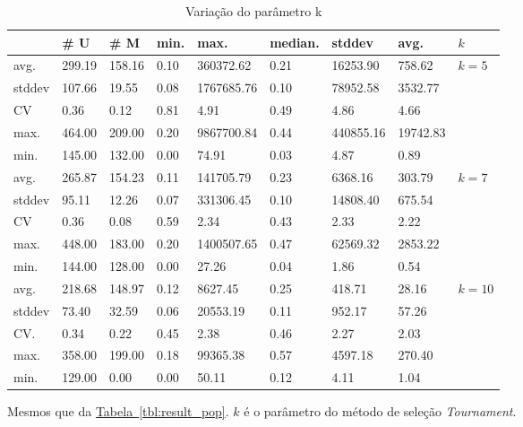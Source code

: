 \documentclass[a4paper]{article}
\begin{document}
\begin{table}
  \centering
  \caption{Variação do parâmetro k}
  \label{tbl:var_k}
  \begin{tabularx}{1\textwidth}{| X | X | X | X | X | X | X | X | X |}
    \hline
    &  \# U & \# M & min. & max. & median. & stddev & avg. & $k$ \\ \hline \hline
avg. & 299.19 & 158.16 & 0.10 & 360372.62 & 0.21 & 16253.90 & 758.62 & \multirow{5}{1.5cm}{$k=5$} \\ \cline{1-8}
stddev & 107.66 & 19.55 & 0.08 & 1767685.76 & 0.10 & 78952.58 & 3532.77 & \\ \cline{1-8}
CV & 0.36 & 0.12 & 0.81 & 4.91 & 0.49 & 4.86 & 4.66 & \\ \cline{1-8}
max. & 464.00 & 209.00 & 0.20 & 9867700.84 & 0.44 & 440855.16 & 19742.83 & \\ \cline{1-8}
min. & 145.00 & 132.00 & 0.00 & 74.91 & 0.03 & 4.87 & 0.89 & \\ \hline \hline
avg. & 265.87 & 154.23 & 0.11 & 141705.79 & 0.23 & 6368.16 & 303.79 & \multirow{5}{1.5cm}{$k=7$} \\ \cline{1-8}
stddev & 95.11 & 12.26 & 0.07 & 331306.45 & 0.10 & 14808.40 & 675.54 & \\ \cline{1-8}
CV & 0.36 & 0.08 & 0.59 & 2.34 & 0.43 & 2.33 & 2.22 & \\ \cline{1-8}
max. & 448.00 & 183.00 & 0.20 & 1400507.65 & 0.47 & 62569.32 & 2853.22 & \\ \cline{1-8}
min. & 144.00 & 128.00 & 0.00 & 27.26 & 0.04 & 1.86 & 0.54 & \\ \hline \hline
avg. & 218.68 & 148.97 & 0.12 & 8627.45 & 0.25 & 418.71 & 28.16 & \multirow{5}{1.5cm}{$k=10$}\\ \cline{1-8}
stddev & 73.40 & 32.59 & 0.06 & 20553.19 & 0.11 & 952.17 & 57.26 & \\ \cline{1-8}
CV. & 0.34 & 0.22 & 0.45 & 2.38 & 0.46 & 2.27 & 2.03 & \\ \cline{1-8}
max. & 358.00 & 199.00 & 0.18 & 99365.38 & 0.57 & 4597.18 & 270.40 & \\ \cline{1-8}
min. & 129.00 & 0.00 & 0.00 & 50.11 & 0.12 & 4.11 & 1.04 & \\ \hline 
  \end{tabularx}
  \begin{minipage}{0.9\textwidth}
    {\center \footnotesize
      Mesmos que da \hyperref[tbl:result_pop]{Tabela~\ref*{tbl:result_pop}}.
      $k$ é o parâmetro do método de seleção \textit{Tournament}.
    }
  \end{minipage}
  
\end{table}
\end{document}
